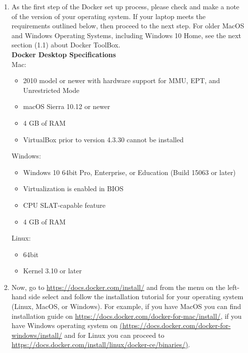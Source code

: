 \begin{enumerate}
	\item As the first step of the Docker set up process, please check and make a note of the version of your operating system. If your laptop meets the requirements outlined below, then proceed to the next step. For older MacOS and Windows Operating Systems, including Windows 10 Home, see the next section (1.1) about Docker ToolBox.
 \\
 
 \textbf{Docker Desktop Specifications} \\
 Mac: 
 	\begin{itemize}
 		\item 2010 model or newer with hardware support for MMU, EPT, and Unrestricted Mode
 		\item macOS Sierra 10.12 or newer
 		\item 4 GB of RAM
 		\item VirtualBox prior to version 4.3.30 cannot be installed
	\end{itemize}
Windows: 
 	\begin{itemize}
		\item Windows 10 64bit Pro, Enterprise, or Education (Build 15063 or later)
		\item Virtualization is enabled in BIOS
		\item CPU SLAT-capable feature
		\item 4 GB of RAM
	\end{itemize}
Linux: 
 	\begin{itemize}
		\item 64bit
		\item Kernel 3.10 or later
	\end{itemize}
	\item Now, go to \url{https://docs.docker.com/install/} and  from the menu on the left-hand side select and follow the installation tutorial for your operating system (Linux, MacOS, or Windows). For example, if you have  
 MacOS you can find installation guide on \url{https://docs.docker.com/docker-for-mac/install/}, if you have Windows operating system on \url{ (https://docs.docker.com/docker-for-windows/install/} and for Linux you can proceed to \url{https://docs.docker.com/install/linux/docker-ce/binaries/)}. 
 

\end{enumerate}

